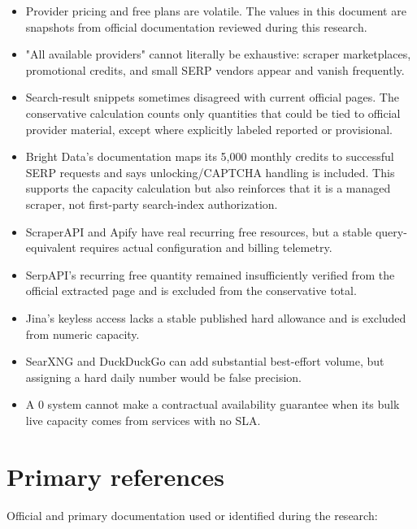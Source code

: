 \documentclass[11pt]{article}
\begin{document}
\begin{itemize}
\item Provider pricing and free plans are volatile.  The values in this document
are snapshots from official documentation reviewed during this research.
\item "All available providers" cannot literally be exhaustive: scraper
marketplaces, promotional credits, and small SERP vendors appear and vanish
frequently.
\item Search-result snippets sometimes disagreed with current official pages.  The
conservative calculation counts only quantities that could be tied to
official provider material, except where explicitly labeled reported or
provisional.
\item Bright Data's documentation maps its 5,000 monthly credits to successful SERP
requests and says unlocking/CAPTCHA handling is included.  This supports the
capacity calculation but also reinforces that it is a managed scraper, not
first-party search-index authorization.
\item ScraperAPI and Apify have real recurring free resources, but a stable
query-equivalent requires actual configuration and billing telemetry.
\item SerpAPI's recurring free quantity remained insufficiently verified from the
official extracted page and is excluded from the conservative total.
\item Jina's keyless access lacks a stable published hard allowance and is excluded
from numeric capacity.
\item SearXNG and DuckDuckGo can add substantial best-effort volume, but assigning a
hard daily number would be false precision.
\item A 0 system cannot make a contractual availability guarantee when its bulk
live capacity comes from services with no SLA.
\end{itemize}
\section*{Primary references}
\label{sec:org8df449a}

Official and primary documentation used or identified during the research:
\end{document}
